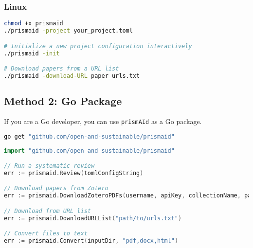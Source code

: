 \subsubsection{Linux}
\begin{commandbox}
\begin{lstlisting}[language=Bash]
chmod +x prismaid
./prismaid -project your_project.toml

# Initialize a new project configuration interactively
./prismaid -init

# Download papers from a URL list
./prismaid -download-URL paper_urls.txt
\end{lstlisting}
\end{commandbox}


\subsection{Method 2: Go Package}

If you are a Go developer, you can use \texttt{prismAId} as a Go package.

\begin{commandbox}
\begin{lstlisting}[language=Bash]
go get "github.com/open-and-sustainable/prismaid"
\end{lstlisting}
\end{commandbox}

\begin{commandbox}
\begin{lstlisting}[language=Go]
import "github.com/open-and-sustainable/prismaid"

// Run a systematic review
err := prismaid.Review(tomlConfigString)

// Download papers from Zotero
err := prismaid.DownloadZoteroPDFs(username, apiKey, collectionName, parentDir)

// Download from URL list
err := prismaid.DownloadURLList("path/to/urls.txt")

// Convert files to text
err := prismaid.Convert(inputDir, "pdf,docx,html")
\end{lstlisting}
\end{commandbox}


